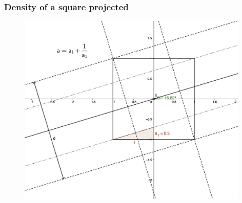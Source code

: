 \documentclass{classeENS}
\begin{document}

\subsubsection{Density of a square projected}
    \begin{figure}[H]
        \centering
        \includegraphics[width=110mm]{schema/schema_square.png}\\
    \end{figure}   
\end{document}

